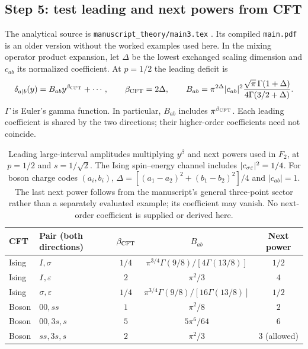 \subsection{Step 5: test leading and next powers from CFT}
\label{sec:complement-theory}
The analytical source is \texttt{manuscript\_theory/main3.tex}
\cite{theoryLarge}. Its compiled \texttt{main.pdf} is an older version
without the worked examples used here. In the mixing operator product
expansion, let $\Delta$ be the lowest exchanged scaling dimension and
$c_{ab}$ its normalized coefficient. At $p=1/2$ the leading deficit is
\begin{equation}
 \delta_{a\mid b}(y)=B_{ab}y^{\beta_{\rm CFT}}+\cdots,\qquad
 \beta_{\rm CFT}=2\Delta,\qquad
 B_{ab}=\pi^{2\Delta}|c_{ab}|^2
 \frac{\sqrt\pi\,\Gamma(1+\Delta)}{4\Gamma(3/2+\Delta)}.
 \label{eq:complement-leading}
\end{equation}
$\Gamma$ is Euler's gamma function. In particular, $B_{ab}$ includes
$\pi^{\beta_{\rm CFT}}$. Each leading coefficient is shared by the
two directions; their higher-order coefficients need not coincide.
\begin{table}[htbp]\centering\small
\begin{tabular}{llccc}\toprule
CFT & Pair (both directions) & $\beta_{\rm CFT}$ & $B_{ab}$ & Next power\\\midrule
Ising & $I,\sigma$ & $1/4$ & $\pi^{3/4}\Gamma(9/8)/[4\Gamma(13/8)]$ & $1/2$\\
Ising & $I,\varepsilon$ & $2$ & $\pi^2/3$ & $4$\\
Ising & $\sigma,\varepsilon$ & $1/4$ & $\pi^{3/4}\Gamma(9/8)/[16\Gamma(13/8)]$ & $1/2$\\
Boson & $00,ss$ & $1$ & $\pi^2/8$ & $2$\\
Boson & $00,3s,s$ & $5$ & $5\pi^6/64$ & $6$\\
Boson & $ss,3s,s$ & $2$ & $\pi^2/3$ & $3$ (allowed)\\\bottomrule
\end{tabular}
\caption{Leading large-interval amplitudes multiplying $y^\beta$ and
next powers used in $F_2$, at $p=1/2$ and $s=1/\sqrt2$.
The Ising spin--energy channel includes $|c_{\sigma\varepsilon}|^2=1/4$.
For boson charge codes $(a_i,b_i)$,
$\Delta=[(a_1-a_2)^2+(b_1-b_2)^2]/4$ and $|c_{ab}|=1$.
The last next power follows from the manuscript's general three-point
sector rather than a separately evaluated example; its coefficient may
vanish. No next-order coefficient is supplied or derived here.}
\label{tab:complement-theory}
\end{table}

